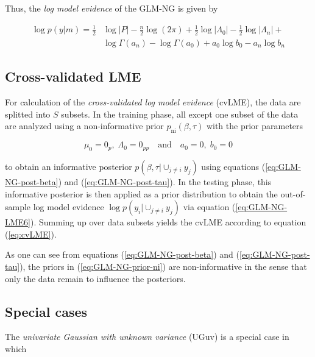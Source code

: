 Thus, the \textit{log model evidence} of the GLM-NG is given by

\vspace{-0.5em}
\begin{equation} \label{eq:GLM-NG-LME6}
\begin{split}
\log p(y|m) = \frac{1}{2} & \log |P| - \frac{n}{2} \log (2 \pi)  + \frac{1}{2} \log |\Lambda_0| - \frac{1}{2} \log |\Lambda_n| + \\ & \log \Gamma(a_n) - \log \Gamma(a_0) + a_0 \log b_0 - a_n \log b_n
\end{split}
\end{equation}


\pagebreak
\subsection{Cross-validated LME} \label{sec:GLM-NG-cvLME}

For calculation of the \textit{cross-validated log model evidence} (cvLME), the data are splitted into $S$ subsets. In the training phase, all except one subset of the data are analyzed using a non-informative prior $p_\mathrm{ni}(\beta, \tau)$ with the prior parameters

\begin{equation} \label{eq:GLM-NG-prior-ni}
\mu_0 = 0_{p}, \; \Lambda_0 = 0_{pp} \quad \text{and} \quad a_0 = 0, \; b_0 = 0
\end{equation}

to obtain an informative posterior $p(\beta, \tau|\cup_{j \neq i} y_j)$ using equations (\ref{eq:GLM-NG-post-beta}) and (\ref{eq:GLM-NG-post-tau}). In the testing phase, this informative posterior is then applied as a prior distribution to obtain the out-of-sample log model evidence $\log p(y_i|\cup_{j \neq i} y_j)$ via equation (\ref{eq:GLM-NG-LME6}). Summing up over data subsets yields the cvLME according to equation (\ref{eq:cvLME}).

As one can see from equations (\ref{eq:GLM-NG-post-beta}) and (\ref{eq:GLM-NG-post-tau}), the priors in (\ref{eq:GLM-NG-prior-ni}) are non-informative in the sense that only the data remain to influence the posteriors.


\subsection{Special cases} \label{sec:GLM-NG-spec}

The \textit{univariate Gaussian with unknown variance} (UGuv) is a special case in which

